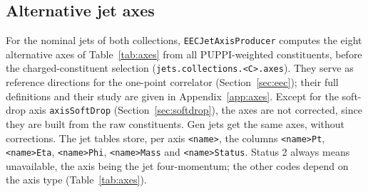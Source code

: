 \documentclass[11pt]{article}
\newcommand{\code}[1]{\texttt{#1}}
\begin{document}
\subsection{Alternative jet axes}
\label{sec:axes}
For the nominal jets of both collections, \code{EECJetAxisProducer} computes the eight alternative axes of
Table~\ref{tab:axes} from all PUPPI-weighted constituents, before the charged-constituent selection
(\code{jets.collections.<C>.axes}). They serve as reference directions for the one-point correlator
(Section~\ref{sec:eec}); their full definitions and their study are given in Appendix~\ref{app:axes}. Except for the
soft-drop axis \code{axisSoftDrop} (Section~\ref{sec:softdrop}), the axes are not corrected, since they are built from
the raw constituents. Gen jets get the same axes, without corrections. The jet tables store, per axis \code{<name>},
the columns \code{<name>Pt}, \code{<name>Eta}, \code{<name>Phi}, \code{<name>Mass} and \code{<name>Status}. Status 2
always means unavailable, the axis being the jet four-momentum; the other codes depend on the axis type
(Table~\ref{tab:axes}).
\end{document}

